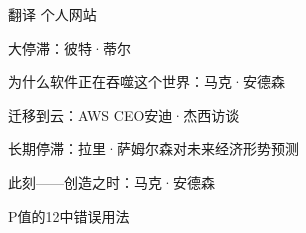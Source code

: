 

\begin{cventries}

  \cventry
    {翻译} %
    {个人网站} %
    {} %
    {} %
    {
      \begin{cvitems} %
        \item {大停滞：彼特·蒂尔}
        \item {为什么软件正在吞噬这个世界：马克·安德森}
        \item {迁移到云：AWS CEO安迪·杰西访谈}
        \item {长期停滞：拉里·萨姆尔森对未来经济形势预测}
        \item {此刻——创造之时：马克·安德森}
        \item {P值的12中错误用法}
      \end{cvitems}
    }

\end{cventries}
